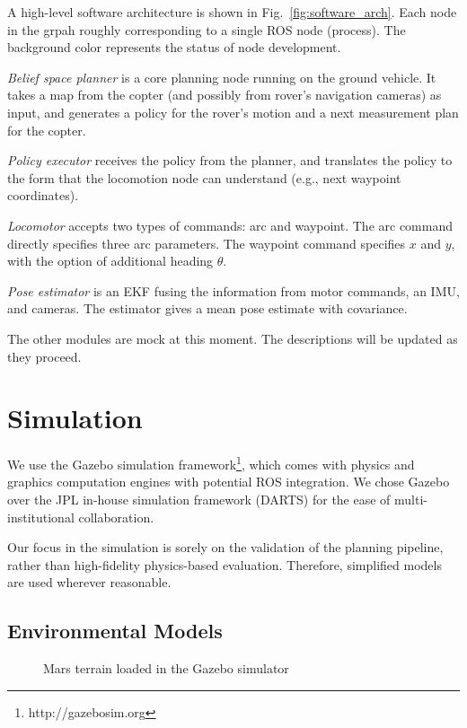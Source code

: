 \documentclass[conference]{IEEEtran}
\begin{document}
A high-level software architecture is shown in Fig.~\ref{fig:software_arch}. Each node in the grpah roughly corresponding to a single ROS node (process). The background color represents the status of node development. 

\textit{Belief space planner} is a core planning node running on the ground vehicle. It takes a map from the copter (and possibly from rover's navigation cameras) as input, and generates a policy for the rover's motion and a next measurement plan for the copter. 

\textit{Policy executor} receives the policy from the planner, and translates the policy to the form that the locomotion node can understand (e.g., next waypoint coordinates).

\textit{Locomotor} accepts two types of commands: arc and waypoint. The arc command directly specifies three arc parameters. The waypoint command specifies $x$ and $y$, with the option of additional heading $\theta$. 

\textit{Pose estimator} is an EKF fusing the information from motor commands, an IMU, and cameras. The estimator gives a mean pose estimate with covariance.


The other modules are mock at this moment. The descriptions will be updated as they proceed. 



\section{Simulation}

We use the Gazebo simulation framework\footnote{http://gazebosim.org}, which comes with physics and graphics computation engines with potential ROS integration. We chose Gazebo over the JPL in-house simulation framework (DARTS) for the ease of multi-institutional collaboration. 

Our focus in the simulation is sorely on the validation of the planning pipeline, rather than high-fidelity physics-based evaluation. Therefore, simplified models are used wherever reasonable.

\subsection{Environmental Models}

\begin{figure}
    \centering
    \caption{Mars terrain loaded in the Gazebo simulator}
    \label{fig:gazebo_scene}
\end{figure}
\end{document}
